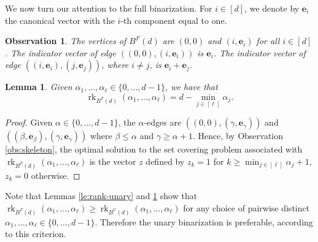 \documentclass[11pt,a4paper]{article}
\newtheorem{lemma}[theorem]{Lemma}
\newtheorem{observation}[theorem]{Observation}
\newcommand{\1}{\textbf{1}}
\newcommand{\rk}{\operatorname{rk}}
\begin{document}

We now turn our attention to the full binarization.
For $i\in[d]$, we denote by $\mathbf e_i$ the canonical vector with the $i$-th component equal to one.

 
 \begin{observation}\label{obs:full}
 The vertices of  $B^F(d)$ are  $(0,0)$ and $(i,\mathbf{e}_i)$ for all $i\in[d]$. 
  The indicator vector of edge  $((0,0),(i,\mathbf{e}_i))$ is $\mathbf{e}_i$. 
  The indicator vector of edge  $((i,\mathbf{e}_i),(j,\mathbf{e}_j))$, where $i\ne j$, is $\mathbf{e}_i+\mathbf{e}_j$.
  \end{observation}

 
 




\begin{lemma}\label{le:rank-full} Given $\alpha_1,\dots,\alpha_{\ell}\in \{0,\dots,d-1\}$, 
we have that 
\[\rk_{B^F(d)}(\alpha_1,\dots,\alpha_{\ell})=d-\min_{j\in[\ell]}\alpha_j.\]
\end{lemma}
\begin{proof}  Given $\alpha \in \{0,\dots,d-1\}$, the $\alpha$-edges are $((0,0), (\gamma,\mathbf{e}_{\gamma}))$ and $((\beta,\mathbf{e}_{\beta}), (\gamma,\mathbf{e}_\gamma))$ where $\beta \le \alpha $ and $\gamma \ge \alpha+1$. 
  Hence, by Observation \ref{obs:skeleton}, the optimal solution to the set covering problem associated with $\rk_{B^F(d)}(\alpha_1,\dots,\alpha_{\ell})$ is the vector $z$ defined by $z_k=1$ for $k\ge \min_{j\in[\ell]}\alpha_j +1$, $z_k=0$ otherwise.  
\end{proof}

Note that Lemmas \ref{le:rank-unary} and \ref{le:rank-full} show that $\rk_{B^F(d)}(\alpha_1,\dots,\alpha_{\ell})\geq\rk_{B^U(d)}(\alpha_1,\dots,\alpha_{\ell})$  for any choice of pairwise distinct  $\alpha_1,\dots,\alpha_{\ell}\in \{0,\dots,d-1\}$. Therefore the unary binarization is preferable, according to this criterion.
\end{document}
